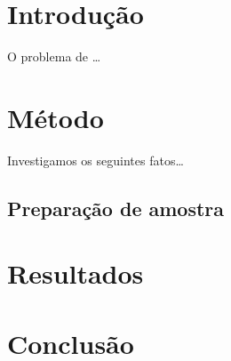 \documentclass{article}
\begin{document}
\section{Introdução}
O problema de \ldots

\section{Método}
Investigamos os seguintes fatos\ldots
\subsection{Preparação de amostra}

\section{Resultados}

\section{Conclusão}
\end{document}
